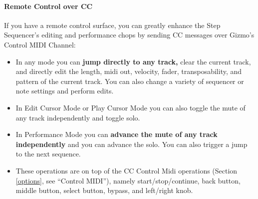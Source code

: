 \documentclass{article}
\begin{document}
\vspace{1em}

\paragraph{Remote Control over CC}  If you have a remote control surface, you can greatly enhance the Step Sequencer's editing and performance chops by sending CC messages over Gizmo's Control MIDI Channel:

\begin{itemize}
\item In any mode you can {\bf jump directly to any track,} clear the current track, and directly edit the length, midi out, velocity, fader, transposability, and pattern of the current track.  You can also change a variety of sequencer or note settings and perform edits.

\item In Edit Cursor Mode or Play Cursor Mode you can also toggle the mute of any track independently and toggle solo.

\item In Performance Mode you can {\bf advance the mute of any track independently} and you can advance the solo.  You can also trigger a jump to the next sequence.

\item These operations are on top of the CC Control Midi operations (Section \ref{options}, see ``Control MIDI''), namely start/stop/continue, back button, middle button, select button, bypass, and left/right knob.
\end{itemize}
\end{document}

